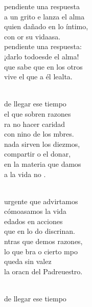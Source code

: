 \documentclass[12pt]{article}
\begin{document}
\begin{multicols*}{2}
\begin{cancion}%
	 pendiente una respuesta \\
	a un grito e lanza el alma\\
	quien dañado en lo íntimo, \\
	con or su vidaasa.\\
	 pendiente una respuesta: \\
	¡darlo todoesde el alma!\\
	que sabe que en los otros \\
	vive el  que a él lealta.\\\jump\\
	\begin{chorus}%
	de llegar ese tiempo \\
	el que sobren razones\\
	ra no hacer caridad \\
	con nino de los mbres.\\
	nada sirven los diezmos,\\
	compartir o el donar,\\
	 en la materia que damos\\
	a la vida no .   \\
	\end{chorus}%
	\jump\\
	urgente que advirtamos \\
	cómoasamos la vida\\
	edados en acciones \\
	que en lo do discrinan.\\
	ntras que demos razones, \\
	lo que bra o cierto mpo\\
	queda sin valez \\
	la oracn del Padreuestro.\\\jump\\
	\begin{chorus}%
	de llegar ese tiempo \\

\end{chorus}
\end{cancion}
\end{multicols*}
\end{document}
